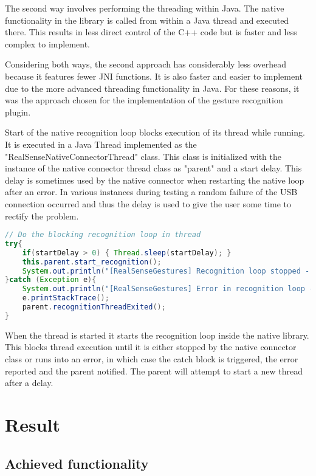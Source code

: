\documentclass[BSA,Bachelor,english]{twbook}%
\begin{document}
The second way involves performing the threading within Java. The native functionality in the library is called from within a Java thread and executed there. This results in less direct control of the C++ code but is faster and less complex to implement.

Considering both ways, the second approach has considerably less overhead because it features fewer JNI functions. It is also faster and easier to implement due to the more advanced threading functionality in Java. For these reasons, it was the approach chosen for the implementation of the gesture recognition plugin.

\newpage
Start of the native recognition loop blocks execution of its thread while running. It is executed in a Java Thread implemented as the "RealSenseNativeConnectorThread" class. This class is initialized with the instance of the native connector thread class as "parent" and a start delay. This delay is sometimes used by the native connector when restarting the native loop after an error. In various instances during testing a random failure of the USB connection occurred and thus the delay is used to give the user some time to rectify the problem.


\begin{lstlisting}[language=Java,name={Functionality inside the native connector threading class},label={rs:javaplugin:6}]
// Do the blocking recognition loop in thread
try{
	if(startDelay > 0) { Thread.sleep(startDelay); }
	this.parent.start_recognition();
	System.out.println("[RealSenseGestures] Recognition loop stopped - Thread exiting");
}catch (Exception e){
	System.out.println("[RealSenseGestures] Error in recognition loop - stack trace below");
	e.printStackTrace();
	parent.recognitionThreadExited();
}
\end{lstlisting}

When the thread is started it starts the recognition loop inside the native library. This blocks thread execution until it is either stopped by the native connector class or runs into an error, in which case the catch block is triggered, the error reported and the parent notified. The parent will attempt to start a new thread after a delay.

\chapter{Result}
\section{Achieved functionality}
\end{document}
